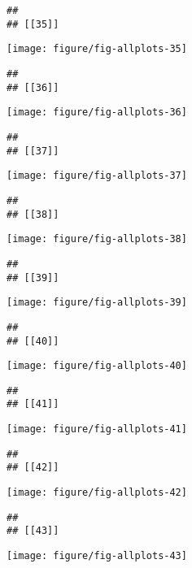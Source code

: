 \documentclass[a4]{article}\usepackage[]{graphicx}\usepackage[]{color}
\makeatletter
\def\maxwidth{ %
  \ifdim\Gin@nat@width>\linewidth
    \linewidth
  \else
    \Gin@nat@width
  \fi
}
\newenvironment{kframe}{%
 \def\at@end@of@kframe{}%
 \ifinner\ifhmode%
  \def\at@end@of@kframe{\end{minipage}}%
  \begin{minipage}{\columnwidth}%
 \fi\fi%
 \def\FrameCommand##1{\hskip\@totalleftmargin \hskip-\fboxsep
 \colorbox{shadecolor}{##1}\hskip-\fboxsep
     \hskip-\linewidth \hskip-\@totalleftmargin \hskip\columnwidth}%
 \MakeFramed {\advance\hsize-\width
   \@totalleftmargin\z@ \linewidth\hsize
   \@setminipage}}%
 {\par\unskip\endMakeFramed%
 \at@end@of@kframe}
\newenvironment{knitrout}{}{} %
\makeatother
\begin{document}
\begin{knitrout}
\begin{kframe}
\begin{verbatim}
## 
## [[35]]
\end{verbatim}
\end{kframe}
\texttt{[image: figure/fig-allplots-35]} 
\begin{kframe}\begin{verbatim}
## 
## [[36]]
\end{verbatim}
\end{kframe}
\texttt{[image: figure/fig-allplots-36]} 
\begin{kframe}\begin{verbatim}
## 
## [[37]]
\end{verbatim}
\end{kframe}
\texttt{[image: figure/fig-allplots-37]} 
\begin{kframe}\begin{verbatim}
## 
## [[38]]
\end{verbatim}
\end{kframe}
\texttt{[image: figure/fig-allplots-38]} 
\begin{kframe}\begin{verbatim}
## 
## [[39]]
\end{verbatim}
\end{kframe}
\texttt{[image: figure/fig-allplots-39]} 
\begin{kframe}\begin{verbatim}
## 
## [[40]]
\end{verbatim}
\end{kframe}
\texttt{[image: figure/fig-allplots-40]} 
\begin{kframe}\begin{verbatim}
## 
## [[41]]
\end{verbatim}
\end{kframe}
\texttt{[image: figure/fig-allplots-41]} 
\begin{kframe}\begin{verbatim}
## 
## [[42]]
\end{verbatim}
\end{kframe}
\texttt{[image: figure/fig-allplots-42]} 
\begin{kframe}\begin{verbatim}
## 
## [[43]]
\end{verbatim}
\end{kframe}
\texttt{[image: figure/fig-allplots-43]} 
\begin{kframe}\begin{verbatim}

\end{verbatim}
\end{kframe}
\end{knitrout}
\end{document}
